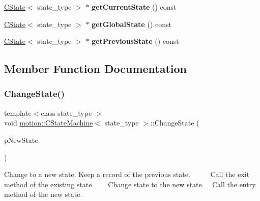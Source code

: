 \begin{DoxyCompactItemize}
\item 
\mbox{\label{classmotion_1_1CStateMachine_a987d982f7d737dbd9e363e334bf1fec6}} 
\mbox{\hyperlink{classmotion_1_1CState}{C\+State}}$<$ state\+\_\+type $>$ $\ast$ {\bfseries get\+Current\+State} () const
\item 
\mbox{\label{classmotion_1_1CStateMachine_a4457b058926d999e32675919fb098185}} 
\mbox{\hyperlink{classmotion_1_1CState}{C\+State}}$<$ state\+\_\+type $>$ $\ast$ {\bfseries get\+Global\+State} () const
\item 
\mbox{\label{classmotion_1_1CStateMachine_a9f1c1616c71601892b697ec203ba88bb}} 
\mbox{\hyperlink{classmotion_1_1CState}{C\+State}}$<$ state\+\_\+type $>$ $\ast$ {\bfseries get\+Previous\+State} () const
\end{DoxyCompactItemize}


\subsection{Member Function Documentation}
\mbox{\label{classmotion_1_1CStateMachine_ab042e01b5080db6e638ad65f3a5cfab4}} 
\subsubsection{\texorpdfstring{Change\+State()}{ChangeState()}}
{\footnotesize\ttfamily template$<$class state\+\_\+type $>$ \\
void \mbox{\hyperlink{classmotion_1_1CStateMachine}{motion\+::\+C\+State\+Machine}}$<$ state\+\_\+type $>$\+::Change\+State (\begin{DoxyParamCaption}\item[{\mbox{\hyperlink{classmotion_1_1CState}{C\+State}}$<$ state\+\_\+type $>$ $\ast$}]{p\+New\+State }\end{DoxyParamCaption})\hspace{0.3cm}{\ttfamily [inline]}}

Change to a new state. Keep a record of the previous state. ~\newline
~\newline
~\newline
 Call the exit method of the existing state. ~\newline
~\newline
 Change state to the new state. ~\newline
 Call the entry method of the new state. \mbox{\label{classmotion_1_1CStateMachine_a562ec539af12a828f189d82d7821ca4a}} 
